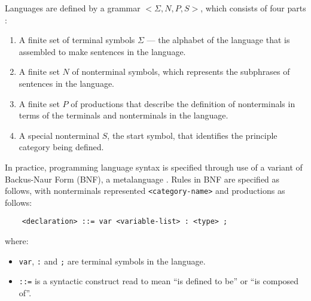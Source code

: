 Languages are defined by a grammar $<\Sigma,N,P,S>$, which consists of four parts \citep{slonneger1995formal}:
\begin{enumerate}
    \item A finite set of terminal symbols $\Sigma$ --- the alphabet of the language that is assembled to make sentences in the language.
    \item A finite set $N$ of nonterminal symbols, which represents the subphrases of sentences in the language.
    \item A finite set $P$ of productions that describe the definition of nonterminals in terms of the terminals and nonterminals in the language. 
    \item A special nonterminal $S$, the start symbol, that identifies the principle category being defined.
\end{enumerate}

In practice, programming language syntax is specified through use of a variant of Backus-Naur Form (BNF), a metalanguage \citep[pg. 21]{Mernik:2005:DDL:1118890.1118892}.
Rules in BNF are specified as follows, with nonterminals represented \lstinline{<category-name>} and productions as follows:
\begin{lstlisting}
    <declaration> ::= var <variable-list> : <type> ;
\end{lstlisting}
where:
\begin{itemize}
    \item \lstinline{var}, \lstinline{:} and \lstinline{;} are terminal symbols in the language. 
    \item \lstinline{::=} is a syntactic construct read to mean ``is defined to be'' or ``is composed of''.
\end{itemize}

